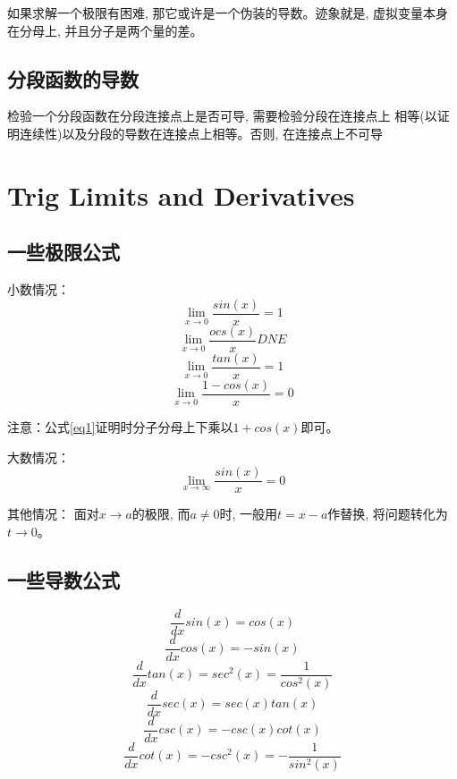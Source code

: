 \documentclass[11pt, b5paper, oneside]{book}
\begin{document}
如果求解一个极限有困难, 那它或许是一个伪装的导数。迹象就是, 虚拟变量本身在分母上, 并且分子是两个量的差。

\section{分段函数的导数}

检验一个分段函数在分段连接点上是否可导, 需要检验分段在连接点上
相等(以证明连续性)以及分段的导数在连接点上相等。否则, 在连接点上不可导

\chapter{Trig Limits and Derivatives}

\section{一些极限公式}

小数情况：
\begin{equation}\label{important limit}
    \lim\limits_{x\to 0}\frac{sin(x)}{x} = 1
\end{equation}
\begin{equation}
    \lim\limits_{x\to 0}\frac{ocs(x)}{x}DNE
\end{equation}
\begin{equation}
    \lim\limits_{x\to 0}\frac{tan(x)}{x} = 1
\end{equation}
\begin{equation}\label{eq1}
    \lim\limits_{x\to 0}\frac{1-cos(x)}{x} = 0
\end{equation}

注意：公式\eqref{eq1}证明时分子分母上下乘以$1+cos(x)$即可。

大数情况：
\begin{equation}
    \lim\limits_{x\to \infty}\frac{sin(x)}{x} = 0
\end{equation}

其他情况：
面对$x\to a$的极限, 而$a\neq 0$时, 一般用$t = x-a$作替换, 将问题转化为$t\to 0$。

\section{一些导数公式}
\begin{equation}
    \frac{d}{dx}sin(x) = cos(x)
\end{equation}
\begin{equation}
    \frac{d}{dx}cos(x) = -sin(x)
\end{equation}
\begin{equation}
    \frac{d}{dx}tan(x) = sec^2(x) = \frac{1}{cos^2(x)}
\end{equation}
\begin{equation}
    \frac{d}{dx}sec(x) = sec(x)tan(x)
\end{equation}
\begin{equation}
    \frac{d}{dx}csc(x) = -csc(x)cot(x)
\end{equation}
\begin{equation}
    \frac{d}{dx}cot(x) = -csc^2(x) = -\frac{1}{sin^2(x)}
\end{equation}
\end{document}
